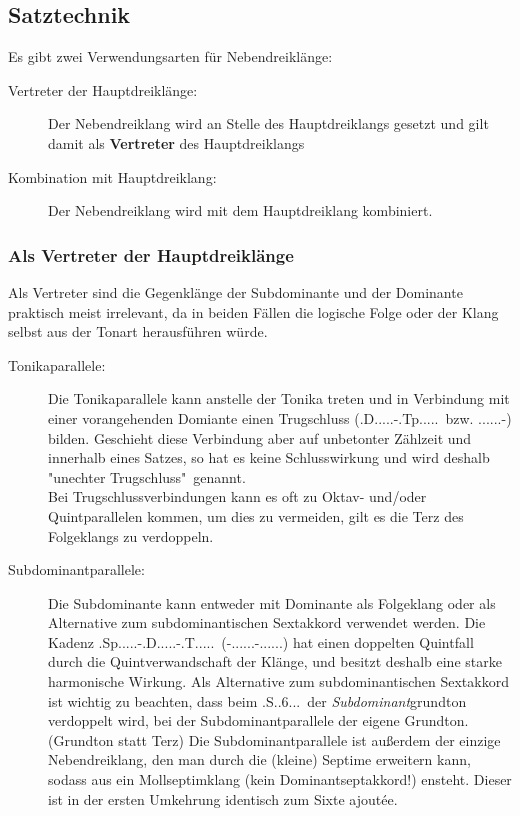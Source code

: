 \documentclass[a4paper]{article}
\newcommand{\dS}[1]{\HH.\uppercase\expandafter{\romannumeral #1\relax}.....} %
\newcommand{\mS}[1]{\textbf{\romannumeral #1}} %
\newcommand{\T}{\HH.T.....}
\newcommand{\Tp}{\HH.Tp.....}
\newcommand{\Shoch}[2]{\HH.S.#2.#1...}
\newcommand{\Sp}{\HH.Sp.....}
\newcommand{\D}{\HH.D.....}
\begin{document}
	\subsection{Satztechnik}
	Es gibt zwei Verwendungsarten für Nebendreiklänge:
	\begin{description}
		\item[Vertreter der Hauptdreiklänge:] Der Nebendreiklang wird an Stelle des Hauptdreiklangs gesetzt und gilt damit als \textbf{Vertreter} des Hauptdreiklangs
		\item[Kombination mit Hauptdreiklang:] Der Nebendreiklang wird mit dem Hauptdreiklang kombiniert.
	\end{description}
	
	\subsubsection{Als Vertreter der Hauptdreiklänge}
	Als Vertreter sind die Gegenklänge der Subdominante und der Dominante praktisch meist irrelevant, da in beiden Fällen die logische Folge oder der Klang selbst aus der Tonart herausführen würde.
	\begin{description}
		\item[Tonikaparallele:] Die Tonikaparallele kann anstelle der Tonika treten und in Verbindung mit einer vorangehenden Domiante einen Trugschluss (\D-\Tp\ bzw. \dS{5}-\mS{6}) bilden. Geschieht diese Verbindung aber auf unbetonter Zählzeit und innerhalb eines Satzes, so hat es keine Schlusswirkung und wird deshalb "{}unechter Trugschluss"\ genannt.\\
		Bei Trugschlussverbindungen kann es oft zu Oktav- und/oder Quintparallelen kommen, um dies zu vermeiden, gilt es die Terz des Folgeklangs zu verdoppeln.

		\item[Subdominantparallele:] Die Subdominante kann entweder mit Dominante als Folgeklang oder als Alternative zum subdominantischen Sextakkord verwendet werden.
			\subitem Die Kadenz \Sp-\D-\T\ (\mS{2}-\dS{5}-\dS{1}) hat einen doppelten Quintfall durch 	die Quintverwandschaft der Klänge, und besitzt deshalb eine starke harmonische Wirkung.
			\subitem Als Alternative zum subdominantischen Sextakkord ist wichtig zu beachten, dass beim \Shoch{6}{}\ der \textit{Subdominant}grundton verdoppelt wird, bei der Subdominantparallele der eigene Grundton. (Grundton statt Terz)
			\subitem Die Subdominantparallele ist außerdem der einzige Nebendreiklang, den man durch die (kleine) Septime erweitern kann, sodass aus ein Mollseptimklang (kein Dominantseptakkord!) ensteht. Dieser ist in der ersten Umkehrung identisch zum Sixte ajoutée.
	\end{description}
\end{document}
